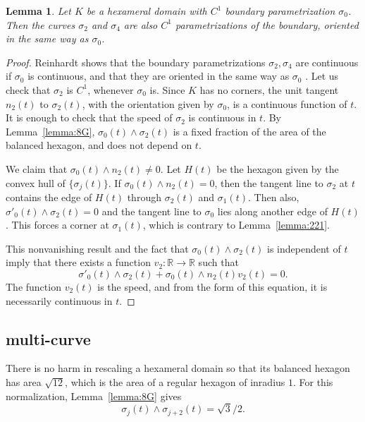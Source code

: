 \documentclass[11pt]{amsart}
\newtheorem{lemma}[equation]{Lemma}
\newcommand{\ring}[1]{\mathbb{#1}}
\begin{document}
\begin{lemma}\label{lemma:sigma2:c1} 
Let $K$ be a hexameral domain with $C^1$ boundary
parametrization $\sigma_0$.  Then the curves $\sigma_2$ and $\sigma_4$
are also $C^1$ parametrizations of the boundary, oriented in the same
way as $\sigma_0$.
\end{lemma}

\begin{proof} Reinhardt shows that the boundary parametrizations
  $\sigma_2,\sigma_4$ are continuous if $\sigma_0$ is continuous, and
  that they are oriented in the same way as $\sigma_0$
  \cite[p.222]{Reinhardt:1934}.  Let us check that $\sigma_2$ is $C^1$, whenever
  $\sigma_0$ is.  Since $K$ has no corners, the unit tangent $n_2(t)$
  to $\sigma_2(t)$, with the orientation given by $\sigma_0$, is a
  continuous function of $t$.  It is enough to check that the speed of
  $\sigma_2$ is continuous in $t$.  By  Lemma~\ref{lemma:8G},
  ${\sigma_0(t)}\land{\sigma_2(t)}$ is a fixed fraction of the area of
  the balanced hexagon, and does not depend on $t$.

  We claim that ${\sigma_0(t)}\land{n_2(t)}\ne 0$.  Let $H(t)$ be the
  hexagon given by the convex hull of $\{\sigma_j(t)\}$.  If
  ${\sigma_0(t)}\land{n_2(t)}=0$, then the tangent line to $\sigma_2$
  at $t$ contains the edge of $H(t)$ through $\sigma_2(t)$ and
  $\sigma_1(t)$.  Then also, ${\sigma'_0(t)}\land{\sigma_2(t)}=0$ and
  the tangent line to $\sigma_0$ lies along another edge of $H(t)$.
  This forces a corner at $\sigma_1(t)$, which is contrary to Lemma~\ref{lemma:221}.

This nonvanishing result and the fact that ${\sigma_0(t)}\land{\sigma_2(t)}$ 
is independent of $t$ imply that there exists a function
$v_2:\ring{R}\to\ring{R}$ such that 
  \begin{equation}\label{eqn:sB}
  {\sigma'_0(t)}\land{\sigma_2(t)} + {\sigma_0(t)}\land{n_2(t)} v_2(t) = 0.
  \end{equation}
The function $v_2(t)$ is the speed, and from the form of this equation,
it is necessarily continuous in $t$.
\end{proof}



\subsection{multi-curve}

There is no harm in rescaling a hexameral domain so that its balanced
hexagon has area $\sqrt{12}$, which is the area of a regular hexagon
of inradius $1$.  For this normalization, Lemma~\ref{lemma:8G} gives
 \begin{equation}\label{eqn:AB}
 {\sigma_j(t)}\land{\sigma_{j+2}(t)} = \sqrt{3}/2.
 \end{equation}
\end{document}
